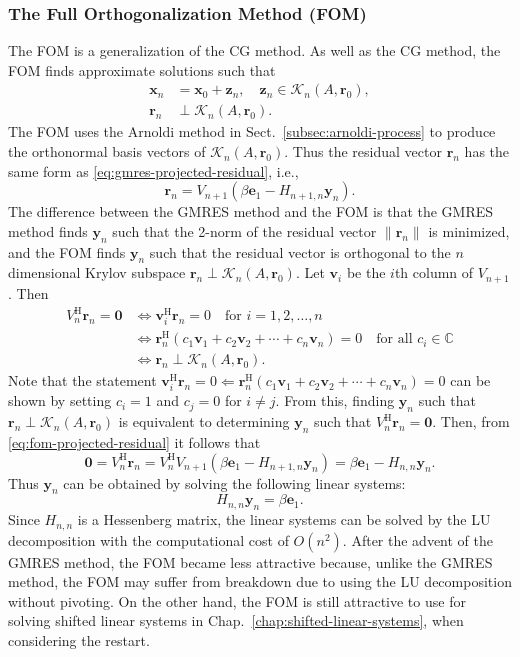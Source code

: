 \subsubsection{{The Full Orthogonalization Method (FOM)}}\label{subsec:fom}
{The FOM  is a generalization of the CG method. As well as the CG method, the FOM finds approximate solutions such that}
\[\begin{aligned}\bm x_n&=\bm x_0+\bm z_n,\quad\bm z_n\in\mathcal K_n(A,\bm r_0),\\\bm r_n&\perp\mathcal K_n(A,\bm r_0).\end{aligned}\]
{The FOM uses the Arnoldi method in Sect.\ \ref{subsec:arnoldi-process} to produce the orthonormal basis vectors of $\mathcal K_n(A,\bm r_0)$. Thus the residual vector $\bm r_n$ has the same form as \eqref{eq:gmres-projected-residual}, i.e.,}
\begin{equation}\label{eq:fom-projected-residual}\bm r_n=V_{n+1}(\beta\bm e_1-H_{n+1,n}\bm y_n).\end{equation}
{The difference between the GMRES method and the FOM is that the GMRES method finds $\bm y_n$ such that the 2-norm of the residual vector $\|\bm r_n\|$ is minimized, and the FOM finds $\bm y_n$ such that the residual vector is orthogonal to the $n$ dimensional Krylov subspace $\bm r_n\perp\mathcal K_n(A,\bm r_0)$. Let $\bm v_i$ be the $i$th column of $V_{n+1}$. Then}
\[\begin{aligned}V_n^{\mathrm H}\bm r_n=\bm0&\Leftrightarrow\bm v_i^{\mathrm H}\bm r_n=0\quad\text{for }i=1,2,\ldots,n\\&\Leftrightarrow\bm r_n^{\mathrm H}(c_1\bm v_1+c_2\bm v_2+\cdots+c_n\bm v_n)=0\quad\text{for all }c_i\in\mathbb C\\&\Leftrightarrow\bm r_n\perp\mathcal K_n(A,\bm r_0).\end{aligned}\]
{Note that the statement $\bm v_i^{\mathrm H}\bm r_n=0\Leftarrow\bm r_n^{\mathrm H}(c_1\bm v_1+c_2\bm v_2+\cdots+c_n\bm v_n)=0$ can be shown by setting $c_i=1$ and $c_j=0$ for $i\ne j$. From this, finding $\bm y_n$ such that $\bm r_n\perp\mathcal K_n(A,\bm r_0)$ is equivalent to determining $\bm y_n$ such that $V_n^{\mathrm H}\bm r_n=\bm0$. Then, from \eqref{eq:fom-projected-residual} it follows that}
\[\bm0=V_n^{\mathrm H}\bm r_n=V_n^{\mathrm H}V_{n+1}(\beta\bm e_1-H_{n+1,n}\bm y_n)=\beta\bm e_1-H_{n,n}\bm y_n.\]
{Thus $\bm y_n$ can be obtained by solving the following linear systems:}
\[H_{n,n}\bm y_n=\beta\bm e_1.\]
{Since $H_{n,n}$ is a Hessenberg matrix, the linear systems can be solved by the LU decomposition with the computational cost of $O(n^2)$. After the advent of the GMRES method, the FOM became less attractive because, unlike the GMRES method, the FOM may suffer from breakdown due to using the LU decomposition without pivoting. On the other hand, the FOM is still attractive to use for solving shifted linear systems in Chap.\ \ref{chap:shifted-linear-systems}, when considering the restart.}
